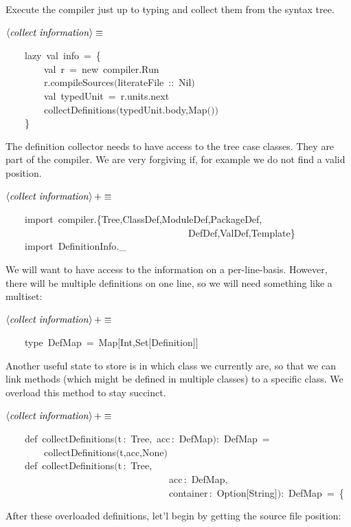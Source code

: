\documentclass[a4paper,12pt]{article}
\begin{document}
Execute the compiler just up to typing and collect them from the syntax tree.

$\left<\mbox{\emph{collect information}}\right>\equiv$
\begin{program}~~~~{\vem lazy}~{\vem val}~info~=~{\small\{}
\\~~~~~~~~{\vem val}~r~=~{\vem new}~compiler.Run
\\~~~~~~~~r.compileSources$($literateFile~{\rm :}{\rm :}~Nil$)$
\\[0.5em]~~~~~~~~{\vem val}~typedUnit~=~r.units.next
\\[0.5em]~~~~~~~~collectDefinitions$($typedUnit.body,Map$($$)$$)$
\\~~~~{\small\}}
\\[0.5em]\end{program}
The definition collector needs to have access to the tree case classes. They
are part of the compiler. We are very forgiving if, for example we do not find
a valid position.

$\left<\mbox{\emph{collect information}}\right>+\equiv$
\begin{program}~~~~{\vem import}~compiler.{\small\{}Tree,ClassDef,ModuleDef,PackageDef,
\\~~~~~~~~~~~~~~~~~~~~~~~~~~~~~~~~~~~~~~DefDef,ValDef,Template{\small\}}
\\~~~~{\vem import}~DefinitionInfo.\_
\\[0.5em]\end{program}
We will want to have access to the information on a per-line-basis. However,
there will be multiple definitions on one line, so we will need something like
a multiset:

$\left<\mbox{\emph{collect information}}\right>+\equiv$
\begin{program}~~~~{\vem type}~DefMap~=~Map$[$Int,Set$[$Definition$]$$]$
\\[0.5em]\end{program}
Another useful state to store is in which class we currently are, so that
we can link methods (which might be defined in multiple classes) to a specific
class. We overload this method to stay succinct.

$\left<\mbox{\emph{collect information}}\right>+\equiv$
\begin{program}~~~~{\vem def}~collectDefinitions$($t\,{\rm :}~Tree,~acc\,{\rm :}~DefMap$)${\rm :}~DefMap~=
\\~~~~~~~~collectDefinitions$($t,acc,None$)$
\\[0.5em]~~~~{\vem def}~collectDefinitions$($t\,{\rm :}~Tree,
\\~~~~~~~~~~~~~~~~~~~~~~~~~~~~~~~~~~acc\,{\rm :}~DefMap,
\\~~~~~~~~~~~~~~~~~~~~~~~~~~~~~~~~~~container\,{\rm :}~Option$[$String$]$$)${\rm :}~DefMap~=~{\small\{}
\\[0.5em]\end{program}
After these overloaded definitions, let'l begin by getting the
source file position:
\end{document}
